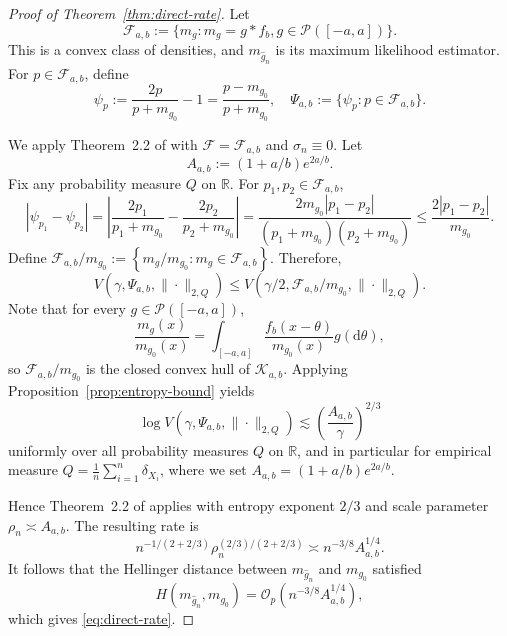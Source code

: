 \documentclass[english, 11pt]{article}
\newcommand{\mrd}{\mathrm{d}}
\theoremstyle{plain}
\theoremstyle{definition}
\theoremstyle{remark}
\begin{document}
\begin{appendix}
\restatehellingerrate*

\begin{proof}[Proof of Theorem~\ref{thm:direct-rate}]
Let
\begin{equation*}
\mathcal F_{a,b}:=\{m_g: m_g=g*f_b, g\in\mathcal P([-a,a])\}.
\end{equation*}
This is a convex class of densities, and $m_{\widehat g_n}$ is its maximum likelihood estimator. 
For $p\in\mathcal F_{a,b}$, define
\begin{equation*}
\psi_p:=\frac{2p}{p+m_{g_0}}-1=\frac{p-m_{g_0}}{p+m_{g_0}}, \quad \mathcal \Psi_{a,b}:=\{\psi_p:p\in\mathcal F_{a,b}\}.
\end{equation*}

We apply Theorem~2.2 of \cite{van1996rates} with $\mathcal F=\mathcal F_{a,b}$ and $\sigma_n\equiv 0$. Let
\begin{equation*}
A_{a,b}:=(1+a/b)e^{2a/b}.
\end{equation*}
Fix any probability measure $Q$ on $\mathbb R$. For $p_1,p_2\in\mathcal F_{a,b}$,
\begin{equation*}
|\psi_{p_1}-\psi_{p_2}| = \left| \frac{2p_1}{p_1+m_{g_0}}-\frac{2p_2}{p_2+m_{g_0}} \right| = \frac{2m_{g_0}|p_1-p_2|}{(p_1+m_{g_0})(p_2+m_{g_0})} \le \frac{2|p_1-p_2|}{m_{g_0}}.
\end{equation*}
Define $\mathcal F_{a,b}/m_{g_0}:=\left\{m_g/m_{g_0} : m_{g}\in \mathcal F_{a,b} \right\}$.
Therefore,
\begin{equation*}
V\left(\gamma,\mathcal \Psi_{a,b},\|\cdot\|_{2,Q}\right) \le V\left(\gamma/2,\mathcal F_{a,b}/m_{g_0},\|\cdot\|_{2,Q}\right).
\end{equation*} 
Note that for every $g\in\mathcal P([-a,a])$,
\begin{equation*}
\frac{m_g(x)}{m_{g_0}(x)}=\int_{[-a,a]} \frac{f_b(x-\theta)}{m_{g_0}(x)} g(\mrd\theta),
\end{equation*}
so $\mathcal F_{a,b}/m_{g_0}$ is the closed convex hull of $\mathcal K_{a,b}$.
Applying Proposition~\ref{prop:entropy-bound} yields
\begin{equation*}
\log V \left(\gamma,\mathcal \Psi_{a,b},\|\cdot\|_{2,Q}\right) \lesssim \left(\frac{A_{a,b}}{\gamma}\right)^{2/3}
\end{equation*}
uniformly over all probability measures $Q$ on $\mathbb R$, and in particular for empirical measure $Q=\frac1n\sum_{i=1}^n\delta_{X_i}$, where we set $A_{a,b} = (1+a/b)e^{2a/b}$.

Hence Theorem~2.2 of \cite{van1996rates} applies with entropy exponent $2/3$ and scale parameter $\rho_n\asymp A_{a,b}$. The resulting rate is
\begin{equation*}
n^{-1/(2+2/3)}\rho_n^{(2/3)/(2+2/3)} \asymp n^{-3/8}A_{a,b}^{1/4}.
\end{equation*}
It follows that the Hellinger distance between $m_{\widehat g_n}$ and $m_{g_0}$ satisfied
\begin{equation*}
H(m_{\widehat g_n},m_{g_0})=\mathcal O_p \left(n^{-3/8}A_{a,b}^{1/4}\right),
\end{equation*}
which gives \eqref{eq:direct-rate}.
\end{proof}


\end{appendix}
\end{document}
